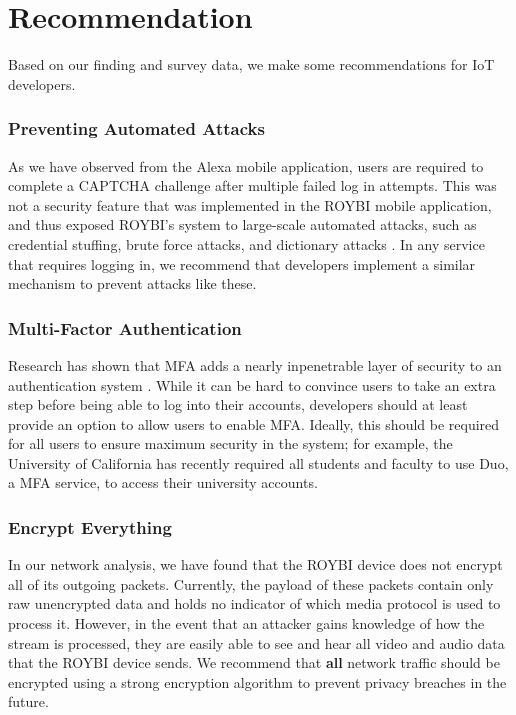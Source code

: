 \documentclass[12pt]{ucthesis}
\begin{document}
\section{Recommendation}
Based on our finding and survey data, we make some recommendations for IoT developers.

\subsubsection{Preventing Automated Attacks}
As we have observed from the Alexa mobile application, users are required to complete a CAPTCHA challenge after multiple failed log in attempts. This was not a security feature that was implemented in the ROYBI mobile application, and thus exposed ROYBI's system to large-scale automated attacks, such as credential stuffing, brute force attacks, and dictionary attacks \cite{brute}. In any service that requires logging in, we recommend that developers implement a similar mechanism to prevent attacks like these.

\subsubsection{Multi-Factor Authentication}
Research has shown that MFA adds a nearly inpenetrable layer of security to an authentication system \cite{mfa}. While it can be hard to convince users to take an extra step before being able to log into their accounts, developers should at least provide an option to allow users to enable MFA. Ideally, this should be required for all users to ensure maximum security in the system; for example, the University of California has recently required all students and faculty to use Duo, a MFA service, to access their university accounts. 

\subsubsection{Encrypt Everything}
In our network analysis, we have found that the ROYBI device does not encrypt all of its outgoing packets. Currently, the payload of these packets contain only raw unencrypted data and holds no indicator of which media protocol is used to process it. However, in the event that an attacker gains knowledge of how the stream is processed, they are easily able to see and hear all video and audio data that the ROYBI device sends. We recommend that \textbf{all} network traffic should be encrypted using a strong encryption algorithm to prevent privacy breaches in the future.
\end{document}
